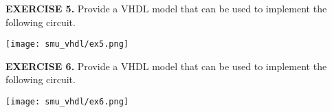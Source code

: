 \vspace{20pt}
\noindent
\begin{minipage}[t]{0.5\textwidth}
\textbf{EXERCISE 5.}
Provide a VHDL model that can be used to implement the following circuit.
\end{minipage}
\begin{minipage}[t]{0.47\textwidth}
\vspace{0pt}\raggedright
\centering
\texttt{[image: smu\_vhdl/ex5.png]}
\end{minipage}

\vspace{20pt}
\noindent
\begin{minipage}[t]{0.5\textwidth}
\textbf{EXERCISE 6.}
Provide a VHDL model that can be used to implement the following circuit.
\end{minipage}
\begin{minipage}[t]{0.47\textwidth}
\vspace{0pt}\raggedright
\centering
\texttt{[image: smu\_vhdl/ex6.png]}
\end{minipage}




